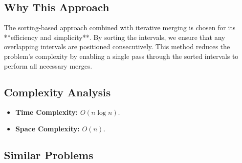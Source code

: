 \subsection*{Why This Approach}

The sorting-based approach combined with iterative merging is chosen for its **efficiency and simplicity**. By sorting the intervals, we ensure that any overlapping intervals are positioned consecutively. This method reduces the problem's complexity by enabling a single pass through the sorted intervals to perform all necessary merges.

\subsection*{Complexity Analysis}
\begin{itemize}
    \item \textbf{Time Complexity:} \( O(n \log n) \).
    
    \item \textbf{Space Complexity:} \( O(n) \).
\end{itemize}

\subsection*{Similar Problems}

